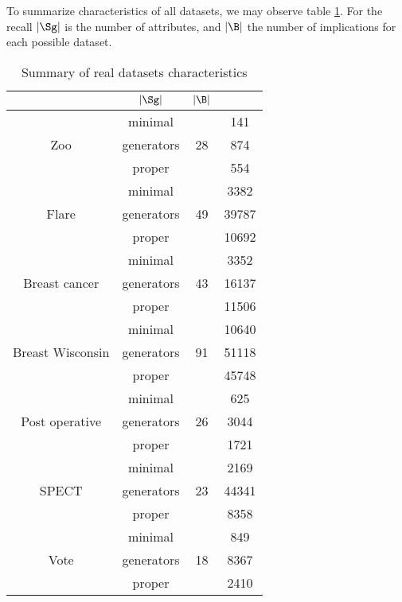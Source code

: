 To summarize characteristics of all datasets, we may observe table \ref{tab:real-DS}. For the recall $|\Sg|$ is the number of attributes, and 
$|\B|$ the number of implications for each possible dataset.

\begin{table}[ht]
	\centering
	\begin{tabular}{| c | c | c | c |}
		\hline \rowcolor{clouds}
		\multicolumn{2}{|c|}{$\I$} & $|\Sg|$ & $|\B|$ \\ \hline
		\multirow{3}{*}{Zoo} & minimal & \multirow{3}{*}{28} & 141 \\
		& generators & & 874 \\
		& proper & & 554 \\ \hline
		
		\multirow{3}{*}{Flare} & minimal & \multirow{3}{*}{49} & 3382 \\
		& generators & & 39787 \\
		& proper & & 10692 \\ \hline
		
		\multirow{3}{*}{Breast cancer} & minimal & \multirow{3}{*}{43} & 3352 \\
		& generators & & 16137 \\
		& proper & & 11506 \\ \hline
		
		\multirow{3}{*}{Breast Wisconsin} & minimal & \multirow{3}{*}{91} & 10640 \\
		& generators & & 51118 \\
		& proper & & 45748 \\ \hline
		
		\multirow{3}{*}{Post operative} & minimal & \multirow{3}{*}{26} & 625 \\
		& generators & & 3044 \\
		& proper & & 1721 \\ \hline
		
		\multirow{3}{*}{SPECT} & minimal & \multirow{3}{*}{23} & 2169 \\
		& generators & & 44341 \\
		& proper & & 8358 \\ \hline
		
		\multirow{3}{*}{Vote} & minimal & \multirow{3}{*}{18} & 849 \\
		& generators & & 8367 \\
		& proper & & 2410 \\ \hline
	\end{tabular}
\caption{Summary of real datasets characteristics}
\label{tab:real-DS}
\end{table}


